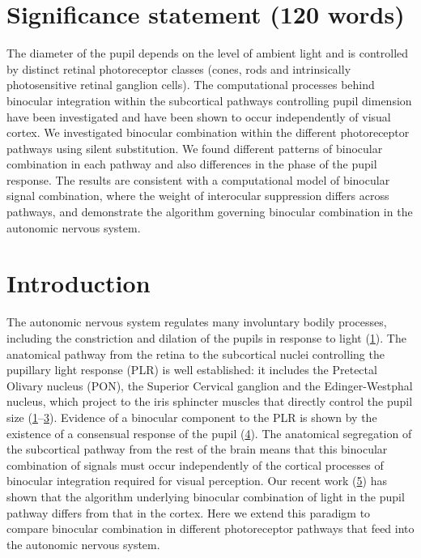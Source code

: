 \documentclass[
]{article}
\begin{document}
\hypertarget{significance-statement-120-words}{%
\section{Significance statement (120 words)}\label{significance-statement-120-words}}

The diameter of the pupil depends on the level of ambient light and is controlled by distinct retinal photoreceptor classes (cones, rods and intrinsically photosensitive retinal ganglion cells). The computational processes behind binocular integration within the subcortical pathways controlling pupil dimension have been investigated and have been shown to occur independently of visual cortex. We investigated binocular combination within the different photoreceptor pathways using silent substitution. We found different patterns of binocular combination in each pathway and also differences in the phase of the pupil response. The results are consistent with a computational model of binocular signal combination, where the weight of interocular suppression differs across pathways, and demonstrate the algorithm governing binocular combination in the autonomic nervous system.

\hypertarget{introduction}{%
\section{Introduction}\label{introduction}}

The autonomic nervous system regulates many involuntary bodily processes, including the constriction and dilation of the pupils in response to light (\protect\hyperlink{ref-McDougal2015}{1}). The anatomical pathway from the retina to the subcortical nuclei controlling the pupillary light response (PLR) is well established: it includes the Pretectal Olivary nucleus (PON), the Superior Cervical ganglion and the Edinger-Westphal nucleus, which project to the iris sphincter muscles that directly control the pupil size (\protect\hyperlink{ref-McDougal2015}{1}--\protect\hyperlink{ref-Wang2015}{3}). Evidence of a binocular component to the PLR is shown by the existence of a consensual response of the pupil (\protect\hyperlink{ref-Wyatt1981}{4}). The anatomical segregation of the subcortical pathway from the rest of the brain means that this binocular combination of signals must occur independently of the cortical processes of binocular integration required for visual perception. Our recent work (\protect\hyperlink{ref-Segala2023}{5}) has shown that the algorithm underlying binocular combination of light in the pupil pathway differs from that in the cortex. Here we extend this paradigm to compare binocular combination in different photoreceptor pathways that feed into the autonomic nervous system.
\end{document}

